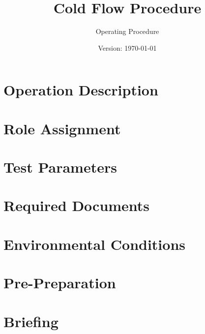 \documentclass{article}
\title{Cold Flow Procedure}
\author{Operating Procedure}
\date{Version: \isodate\today}
\begin{document}
\maketitle

\thispagestyle{fancy}

\renewcommand{\thesection}{\Alph{section}}

\newtoggle{firing}
\togglefalse{firing}

\section{Operation Description}


\section{Role Assignment}


\section{Test Parameters}


\section{Required Documents}


\section{Environmental Conditions}


\newpage


\renewcommand{\thesection}{\arabic{section}}

\setcounter{section}{0}

\section{Pre-Preparation}


\section{Briefing}

\end{document}
